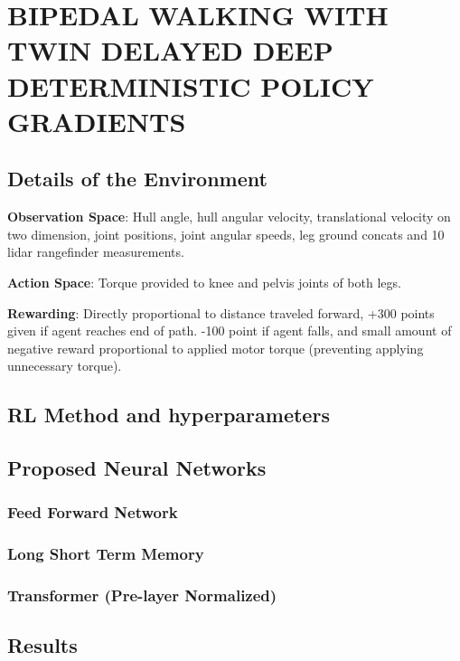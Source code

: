 \chapter{BIPEDAL WALKING WITH TWIN DELAYED DEEP DETERMINISTIC POLICY GRADIENTS}
\label{chap:exp_setup}

\section{Details of the Environment}

\textbf{Observation Space}: Hull angle, hull angular velocity, translational velocity on two dimension, joint positions, joint angular speeds, leg ground concats and 10 lidar rangefinder measurements.

\textbf{Action Space}: Torque provided to knee and pelvis joints of both legs.

\textbf{Rewarding}: Directly proportional to distance traveled forward, +300 points given if agent reaches end of path. -100 point if agent falls, and small amount of negative reward proportional to applied motor torque (preventing applying unnecessary torque).

\section{RL Method and hyperparameters}

\section{Proposed Neural Networks}

\subsection{Feed Forward Network}

\subsection{Long Short Term Memory}

\subsection{Transformer (Pre-layer Normalized)}

\section{Results}